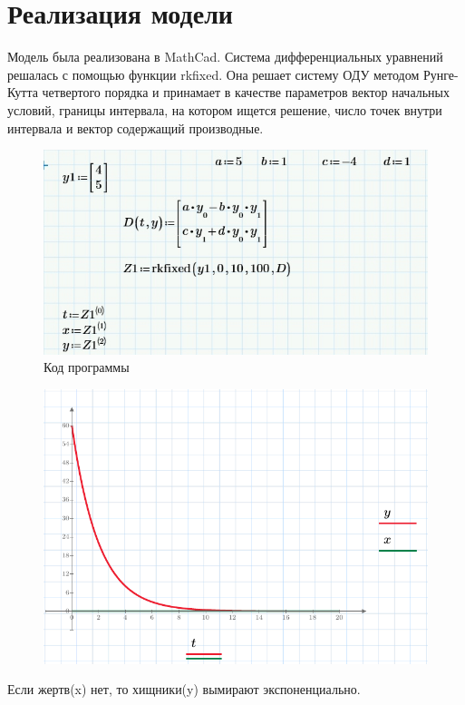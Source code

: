 \documentclass[a4paper, 14pt]{extarticle}
\begin{document}
	\section{Реализация модели}
		Модель была реализована в MathCad. Система дифференциальных уравнений решалась с помощью функции rkfixed.
		Она решает систему ОДУ методом Рунге-Кутта четвертого порядка и принамает в качестве параметров вектор начальных условий, границы интервала, на котором ищется решение, число точек внутри интервала и вектор содержащий производные.
		\begin{figure}[H]
			\centering
			\includegraphics[width = \linewidth]{2.jpg}
			\caption[.] {Код программы}
		\end{figure}
		\begin{figure}[H]
			\centering
			\includegraphics[width = \linewidth]{1.pdf}
			\caption[.] {}
		\end{figure}
		Если жертв(x) нет, то хищники(y) вымирают экспоненциально.
	
\end{document}
